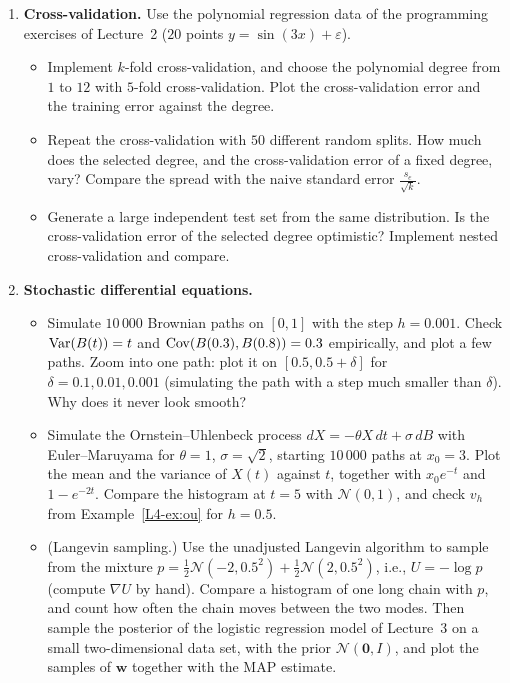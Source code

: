 \begin{enumerate}[label=\textbf{P\arabic*.}, leftmargin=*]
    \item \textbf{Cross-validation.} Use the polynomial regression data of the programming exercises of Lecture~2 ($20$ points $y = \sin(3x) + \varepsilon$).
    \begin{itemize}
        \item Implement $k$-fold cross-validation, and choose the polynomial degree from $1$ to $12$ with $5$-fold cross-validation. Plot the cross-validation error and the training error against the degree.
        \item Repeat the cross-validation with $50$ different random splits. How much does the selected degree, and the cross-validation error of a fixed degree, vary? Compare the spread with the naive standard error $\frac{s_e}{\sqrt{k}}$.
        \item Generate a large independent test set from the same distribution. Is the cross-validation error of the selected degree optimistic? Implement nested cross-validation and compare.
    \end{itemize}

    \item \textbf{Stochastic differential equations.}
    \begin{itemize}
        \item Simulate $10\,000$ Brownian paths on $[0, 1]$ with the step $h = 0.001$. Check $\operatorname{Var}(B(t)) = t$ and $\operatorname{Cov}(B(0.3), B(0.8)) = 0.3$ empirically, and plot a few paths. Zoom into one path: plot it on $[0.5, 0.5 + \delta]$ for $\delta = 0.1, 0.01, 0.001$ (simulating the path with a step much smaller than $\delta$). Why does it never look smooth?
        \item Simulate the Ornstein--Uhlenbeck process $dX = -\theta X\,dt + \sigma\,dB$ with Euler--Maruyama for $\theta = 1$, $\sigma = \sqrt{2}$, starting $10\,000$ paths at $x_0 = 3$. Plot the mean and the variance of $X(t)$ against $t$, together with $x_0e^{-t}$ and $1 - e^{-2t}$. Compare the histogram at $t = 5$ with $\mathcal{N}(0, 1)$, and check $v_h$ from Example~\ref{L4-ex:ou} for $h = 0.5$.
        \item (Langevin sampling.) Use the unadjusted Langevin algorithm to sample from the mixture $p = \frac{1}{2}\mathcal{N}(-2, 0.5^2) + \frac{1}{2}\mathcal{N}(2, 0.5^2)$, i.e., $U = -\log p$ (compute $\nabla U$ by hand). Compare a histogram of one long chain with $p$, and count how often the chain moves between the two modes. Then sample the posterior of the logistic regression model of Lecture~3 on a small two-dimensional data set, with the prior $\mathcal{N}(\mathbf{0}, I)$, and plot the samples of $\mathbf{w}$ together with the MAP estimate.
    \end{itemize}


\end{enumerate}
